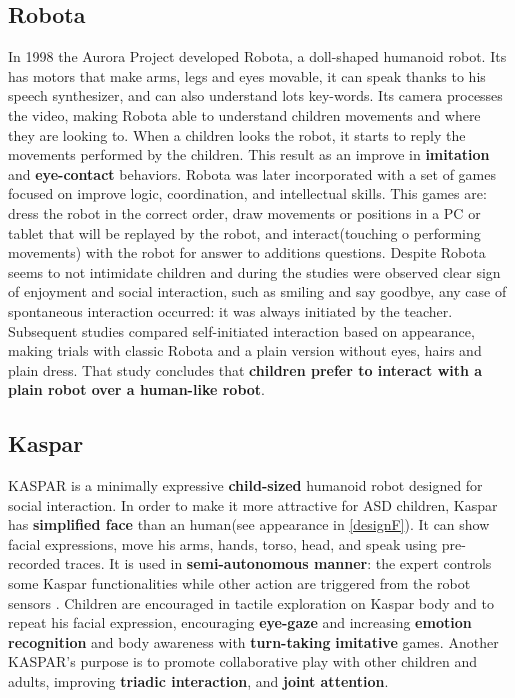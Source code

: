 \subsection{Robota}
In 1998 the Aurora Project developed Robota\cite{billard1998experiments}, a doll-shaped humanoid robot. Its has motors that make arms, legs and eyes movable, it can speak thanks to his speech synthesizer, and can also understand lots key-words. Its camera processes the video, making Robota able to understand children movements and where they are looking to. When a children looks the robot, it starts to reply the movements performed by the children. This result as an improve in \textbf{imitation} and \textbf{eye-contact} behaviors. 
Robota was later\cite{billard2003robota} incorporated with a set of games focused on improve logic, coordination, and intellectual skills. This games are: dress the robot in the correct order, draw movements or positions in a PC or tablet that will be replayed by the robot, and interact(touching o performing movements) with the robot for answer to additions questions. Despite Robota seems to not intimidate children and during the studies were observed clear sign of enjoyment and social interaction, such as smiling and say goodbye, any case of spontaneous interaction occurred: it was always initiated by the teacher. Subsequent studies compared self-initiated interaction based on appearance, making trials with classic Robota and a plain version without eyes, hairs and plain dress. That study concludes that \textbf{children prefer to interact with a plain robot over a human-like robot}\cite{billard2007building}.

\subsection{Kaspar}
KASPAR is a minimally expressive \textbf{child-sized} humanoid robot designed for social interaction. In order to make it more attractive for ASD children, Kaspar has \textbf{simplified face} than an human(see appearance in \ref{designF}). It can show facial expressions, move his arms, hands, torso, head\cite{huijnen2016matching}, and speak using pre-recorded traces. It is used in \textbf{semi-autonomous manner}: the expert controls some Kaspar functionalities while other action are triggered from the robot sensors .
Children are encouraged in tactile exploration on Kaspar body and to repeat his facial expression, encouraging \textbf{eye-gaze} and increasing \textbf{emotion recognition} and body awareness with \textbf{turn-taking} \textbf{imitative} games. Another KASPAR’s purpose is to promote collaborative play with other children and adults, improving \textbf{triadic interaction}, and \textbf{joint attention}. 

